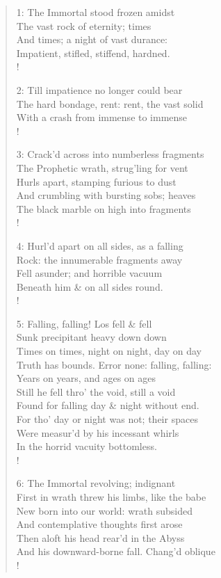 \documentclass[9pt]{extarticle}
\begin{document}
\begin{verse}
\begin{altverse} 
		
		1: The Immortal stood frozen amidst\\
		The vast rock of eternity; times\\
		And times; a night of vast durance:\\
		Impatient, stifled, stiffend, hardned.\\!
		
		2: Till impatience no longer could bear\\
		The hard bondage, rent: rent, the vast solid\\
		With a crash from immense to immense\\!
		
		3: Crack’d across into numberless fragments\\
		The Prophetic wrath, strug’ling for vent\\
		Hurls apart, stamping furious to dust\\
		And crumbling with bursting sobs; heaves\\
		The black marble on high into fragments\\!
		
		4: Hurl’d apart on all sides, as a falling\\
		Rock: the innumerable fragments away\\
		Fell asunder; and horrible vacuum\\
		Beneath him \& on all sides round.\\!
		
		5: Falling, falling! Los fell \& fell\\
		Sunk precipitant heavy down down\\
		Times on times, night on night, day on day\\
		Truth has bounds. Error none: falling, falling:\\
		Years on years, and ages on ages\\
		Still he fell thro' the void, still a void\\
		Found for falling day \& night without end.\\
		For tho’ day or night was not; their spaces\\
		Were measur’d by his incessant whirls\\
		In the horrid vacuity bottomless.\\!
		
		6: The Immortal revolving; indignant\\
		First in wrath threw his limbs, like the babe\\
		New born into our world: wrath subsided\\
		And contemplative thoughts first arose\\
		Then aloft his head rear’d in the Abyss\\
		And his downward-borne fall. Chang’d oblique\\!
		

\end{altverse}
\end{verse}
\end{document}
